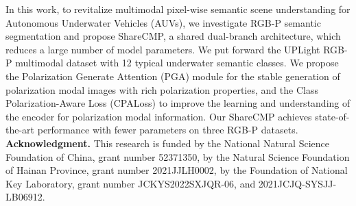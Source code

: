 \documentclass[10pt,twocolumn,letterpaper]{article}
\begin{document}
In this work, to revitalize multimodal pixel-wise semantic scene understanding for Autonomous Underwater Vehicles (AUVs), we investigate RGB-P semantic segmentation and propose ShareCMP, a shared dual-branch architecture, which reduces a large number of model parameters. We put forward the UPLight RGB-P multimodal dataset with 12 typical underwater semantic classes. We propose the Polarization Generate Attention (PGA) module for the stable generation of polarization modal images with rich polarization properties, and the Class Polarization-Aware Loss (CPALoss) to improve the learning and understanding of the encoder for polarization modal information. Our ShareCMP achieves state-of-the-art performance with fewer parameters on three RGB-P datasets.
\medskip
\newline
\noindent
\textbf{Acknowledgment.}
This research is funded by the National Natural Science Foundation of China, grant number 52371350, by the Natural Science Foundation of Hainan Province, grant number 2021JJLH0002, by the Foundation of National Key Laboratory, grant number JCKYS2022SXJQR-06, and 2021JCJQ-SYSJJ-LB06912.  {
    \small
    
    
}
\end{document}
